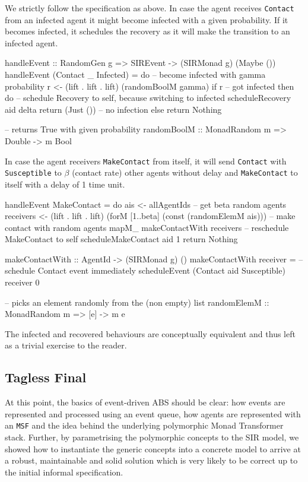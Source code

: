 We strictly follow the specification as above. In case the agent receives \texttt{Contact} from an infected agent it might become infected with a given probability. If it becomes infected, it schedules the recovery as it will make the transition to an infected agent.

\begin{HaskellCode}
handleEvent :: RandomGen g => SIREvent -> (SIRMonad g) (Maybe ())
handleEvent (Contact _ Infected) = do
  -- become infected with gamma probability
  r <- (lift . lift . lift) (randomBoolM gamma)
  if r
    -- got infected 
    then do
      -- schedule Recovery to self, because switching to infected
      scheduleRecovery aid delta
      return (Just ())
    -- no infection
    else return Nothing

-- returns True with given probability
randomBoolM :: MonadRandom m => Double -> m Bool
\end{HaskellCode}

In case the agent receivers \texttt{MakeContact} from itself, it will send \texttt{Contact} with \texttt{Susceptible} to $\beta$ (contact rate) other agents without delay and \texttt{MakeContact} to itself with a delay of 1 time unit.

\begin{HaskellCode}
handleEvent MakeContact = do
  ais <- allAgentIds
  -- get beta random agents
  receivers <- (lift . lift . lift) (forM [1..beta] (const (randomElemM ais)))
  -- make contact with random agents
  mapM_ makeContactWith receivers
  -- reschedule MakeContact to self
  scheduleMakeContact aid 1
  return Nothing
  
makeContactWith :: AgentId -> (SIRMonad g) ()
makeContactWith receiver = 
  -- schedule Contact event immediately
  scheduleEvent (Contact aid Susceptible) receiver 0

-- picks an element randomly from the (non empty) list
randomElemM :: MonadRandom m => [e] -> m e
\end{HaskellCode}

The infected and recovered behaviours are conceptually equivalent and thus left as a trivial exercise to the reader. 

\subsection{Tagless Final}
\label{sec:tagless_final_basics}
At this point, the basics of event-driven ABS should be clear: how events are represented and processed using an event queue, how agents are represented with an \texttt{MSF} and the idea behind the underlying polymorphic Monad Transformer stack. Further, by parametrising the polymorphic concepts to the SIR model, we showed how to instantiate the generic concepts into a concrete model to arrive at a robust, maintainable and solid solution which is very likely to be correct up to the initial informal specification.

